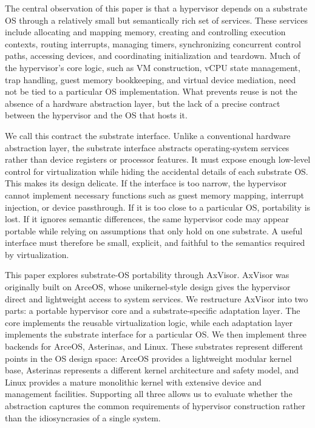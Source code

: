 The central observation of this paper is that a hypervisor depends on a substrate OS through a relatively small but semantically rich set of services. These services include allocating and mapping memory, creating and controlling execution contexts, routing interrupts, managing timers, synchronizing concurrent control paths, accessing devices, and coordinating initialization and teardown. Much of the hypervisor's core logic, such as VM construction, vCPU state management, trap handling, guest memory bookkeeping, and virtual device mediation, need not be tied to a particular OS implementation. What prevents reuse is not the absence of a hardware abstraction layer, but the lack of a precise contract between the hypervisor and the OS that hosts it.

We call this contract the substrate interface. Unlike a conventional hardware abstraction layer, the substrate interface abstracts operating-system services rather than device registers or processor features. It must expose enough low-level control for virtualization while hiding the accidental details of each substrate OS. This makes its design delicate. If the interface is too narrow, the hypervisor cannot implement necessary functions such as guest memory mapping, interrupt injection, or device passthrough. If it is too close to a particular OS, portability is lost. If it ignores semantic differences, the same hypervisor code may appear portable while relying on assumptions that only hold on one substrate. A useful interface must therefore be small, explicit, and faithful to the semantics required by virtualization.

This paper explores substrate-OS portability through AxVisor. AxVisor was originally built on ArceOS, whose unikernel-style design gives the hypervisor direct and lightweight access to system services. We restructure AxVisor into two parts: a portable hypervisor core and a substrate-specific adaptation layer. The core implements the reusable virtualization logic, while each adaptation layer implements the substrate interface for a particular OS. We then implement three backends for ArceOS, Asterinas, and Linux. These substrates represent different points in the OS design space: ArceOS provides a lightweight modular kernel base, Asterinas represents a different kernel architecture and safety model, and Linux provides a mature monolithic kernel with extensive device and management facilities. Supporting all three allows us to evaluate whether the abstraction captures the common requirements of hypervisor construction rather than the idiosyncrasies of a single system.

